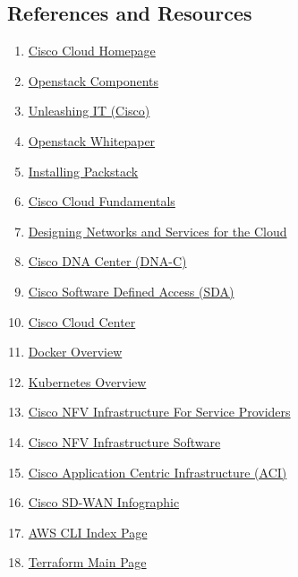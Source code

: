 \subsection{References and Resources}
\begin{enumerate}
  \item \href{http://www.cisco.com/go/cloud}{Cisco Cloud Homepage}
  \item \href{https://en.wikipedia.org/wiki/OpenStack#Components}{Openstack Components}
  \item \href{http://www.unleashingit.com/}{Unleashing IT (Cisco)}
  \item \href{http://getcloudify.org/2014/07/18/openstack-wiki-open-cloud.html}{Openstack Whitepaper}
  \item \href{http://rdoproject.org/install/packstack/}{Installing Packstack}
  \item \href{https://learningnetworkstore.cisco.com/store-search?searchPhrase=CLDFND}{Cisco Cloud Fundamentals}
  \item \href{http://www.ciscopress.com/store/designing-networks-and-services-for-the-cloud-delivering-9781587142949}{Designing Networks and Services for the Cloud}
  \item \href{https://www.cisco.com/c/en/us/products/collateral/cloud-systems-management/dna-center/nb-09-dna-center-data-sheet-cte-en.html}{Cisco DNA Center (DNA-C)}
  \item \href{https://www.cisco.com/c/dam/en/us/solutions/collateral/enterprise-networks/software-defined-access/solution-overview-c22-739012.pdf?oid=sowen000311}{Cisco Software Defined Access (SDA)}
  \item \href{https://www.cisco.com/c/dam/en/us/products/collateral/cloud-systems-management/cloudcenter/white-paper-c11-737224.pdf}{Cisco Cloud Center}
  \item \href{https://www.docker.com/what-docker}{Docker Overview}
  \item \href{https://kubernetes.io/docs/tutorials/kubernetes-basics/}{Kubernetes Overview}
  \item \href{https://www.cisco.com/c/dam/en/us/solutions/collateral/service-provider/network-functions-virtualization-nfv-infrastructure/pa-cisco-nfv-infrastructure-solution-brief.pdf}{Cisco NFV Infrastructure For Service Providers}
  \item \href{https://www.cisco.com/c/en/us/solutions/collateral/enterprise-networks/enterprise-network-functions-virtualization-nfv/datasheet-c78-738570.html}{Cisco NFV Infrastructure Software}
  \item \href{https://www.cisco.com/c/en/us/solutions/data-center-virtualization/application-centric-infrastructure/index.html}{Cisco Application Centric Infrastructure (ACI)}
  \item \href{https://www.cisco.com/c/dam/en/us/solutions/collateral/enterprise-networks/sd-wan/nb-07-cte-infograph-golin-en.pdf}{Cisco SD-WAN Infographic}
  \item \href{https://docs.aws.amazon.com/cli/index.html#lang/en_us}{AWS CLI Index Page}
  \item \href{https://www.terraform.io/}{Terraform Main Page}
\end{enumerate}
